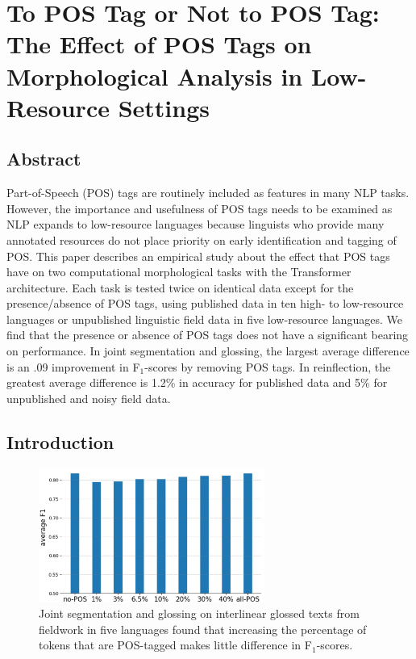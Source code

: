 \chapter{To POS Tag or Not to POS Tag: The Effect of POS Tags on Morphological Analysis in Low-Resource Settings}

\section{Abstract}

Part-of-Speech (POS) tags are routinely included as features in many NLP tasks. However, the importance and usefulness of POS tags needs to be examined as NLP expands to low-resource languages because linguists who provide many annotated resources do not place priority on early identification and tagging of POS. This paper describes an empirical study about the effect that POS tags have on two computational morphological tasks with the Transformer architecture. Each task is tested twice on identical data except for the presence/absence of POS tags, using published data in ten high- to low-resource languages or unpublished linguistic field data in five low-resource languages. We find that the presence or absence of POS tags does not have a significant bearing on performance. In joint segmentation and glossing, the largest average difference is an .09 improvement in F$_1$-scores by removing POS tags. In reinflection, the greatest average difference is 1.2\% in accuracy for published data and 5\% for unpublished and noisy field data.


\section{Introduction}
\label{sec:intro}


\begin{figure}
    \centering
    \includegraphics[width=20em]{figs/POS-avgSegGloss.jpg}
    \caption[POS Tags in Joint Segmentation and Glossing]{Joint segmentation and glossing on interlinear glossed texts from fieldwork in five languages found that increasing the percentage of tokens that are POS-tagged makes little difference in F$_1$-scores.}
    \label{fig:avgseggls}
\end{figure}

